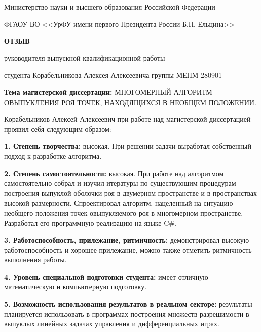 \documentclass[12pt]{article}
\begin{document}
\begin{center}

Министерство науки и высшего образования Российской Федерации

\smallskip

ФГАОУ ВО <<УрФУ имени первого Президента России Б.Н. Ельцина>>

\medskip

\large

\textbf{ОТЗЫВ}

руководителя выпускной квалификационной работы

студента Корабельникова Алексея Алексеевича группы МЕНМ-280901
 
\medskip

\normalsize

\raggedright

\noindent
\textbf{Тема магистерской диссертации:} МНОГОМЕРНЫЙ АЛГОРИТМ ОВЫПУКЛЕНИЯ РОЯ ТОЧЕК, НАХОДЯЩИХСЯ В НЕОБЩЕМ ПОЛОЖЕНИИ.
\end{center}

Корабельников Алексей Алексеевич при работе над магистерской диссертацией проявил себя
следующим образом:

\noindent
\textbf{1.  Степень творчества:} высокая. При решении задачи выработал собственный подход к разработке алгоритма.

\smallskip

\noindent
\textbf{2.  Степень самостоятельности:} высокая. При работе над алгоритмом самостоятельно собрал и изучил итературы по существующим процедурам построения выпуклой оболочки роя в двумерном пространстве и в пространствах высокой размерности. Спроектировал алгоритм, нацеленный на ситуацию необщего положения точек овыпукляемого роя в многомерном пространстве. Разработал его программную реализацию на языке C\#.

\smallskip

\noindent
\textbf{3.  Работоспособность, прилежание, ритмичность:} демонстрировал высокую работоспособность и хорошее прилежание, можно также отметить ритмичность выполнения работы.

\smallskip

\noindent
\textbf{4.  Уровень специальной подготовки студента:} имеет отличную математическую и
компьютерную подготовку.

\smallskip

\noindent
\textbf{5. Возможность использования результатов в реальном секторе:} результаты планируется использовать в программах построения множеств разрешимости в выпуклых линейных задачах управления и дифференциальных играх.
\end{document}
